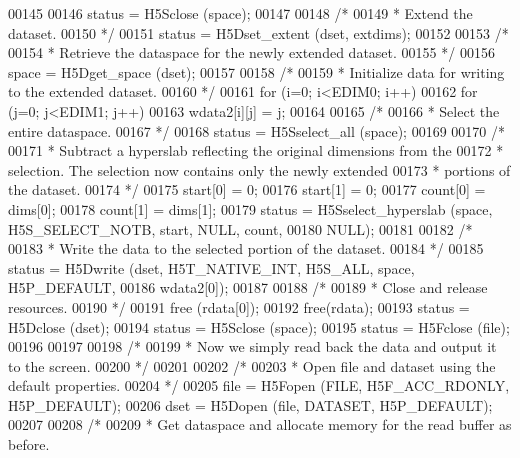 \begin{DoxyCode}
{00145 
00146     status = H5Sclose (space);
00147 
00148     \textcolor{comment}{/*}
00149 \textcolor{comment}{     * Extend the dataset.}
00150 \textcolor{comment}{     */}
00151     status = H5Dset\_extent (dset, extdims);
00152 
00153     \textcolor{comment}{/*}
00154 \textcolor{comment}{     * Retrieve the dataspace for the newly extended dataset.}
00155 \textcolor{comment}{     */}
00156     space = H5Dget\_space (dset);
00157 
00158     \textcolor{comment}{/*}
00159 \textcolor{comment}{     * Initialize data for writing to the extended dataset.}
00160 \textcolor{comment}{     */}
00161     \textcolor{keywordflow}{for} (i=0; i<EDIM0; i++)
00162         \textcolor{keywordflow}{for} (j=0; j<EDIM1; j++)
00163             wdata2[i][j] = j;
00164 
00165     \textcolor{comment}{/*}
00166 \textcolor{comment}{     * Select the entire dataspace.}
00167 \textcolor{comment}{     */}
00168     status = H5Sselect\_all (space);
00169 
00170     \textcolor{comment}{/*}
00171 \textcolor{comment}{     * Subtract a hyperslab reflecting the original dimensions from the}
00172 \textcolor{comment}{     * selection.  The selection now contains only the newly extended}
00173 \textcolor{comment}{     * portions of the dataset.}
00174 \textcolor{comment}{     */}
00175     start[0] = 0;
00176     start[1] = 0;
00177     count[0] = dims[0];
00178     count[1] = dims[1];
00179     status = H5Sselect\_hyperslab (space, H5S\_SELECT\_NOTB, start, NULL, count,
00180                 NULL);
00181 
00182     \textcolor{comment}{/*}
00183 \textcolor{comment}{     * Write the data to the selected portion of the dataset.}
00184 \textcolor{comment}{     */}
00185     status = H5Dwrite (dset, H5T\_NATIVE\_INT, H5S\_ALL, space, H5P\_DEFAULT,
00186                 wdata2[0]);
00187 
00188     \textcolor{comment}{/*}
00189 \textcolor{comment}{     * Close and release resources.}
00190 \textcolor{comment}{     */}
00191     free (rdata[0]);
00192     free(rdata);
00193     status = H5Dclose (dset);
00194     status = H5Sclose (space);
00195     status = H5Fclose (file);
00196 
00197 
00198     \textcolor{comment}{/*}
00199 \textcolor{comment}{     * Now we simply read back the data and output it to the screen.}
00200 \textcolor{comment}{     */}
00201 
00202     \textcolor{comment}{/*}
00203 \textcolor{comment}{     * Open file and dataset using the default properties.}
00204 \textcolor{comment}{     */}
00205     file = H5Fopen (FILE, H5F\_ACC\_RDONLY, H5P\_DEFAULT);
00206     dset = H5Dopen (file, DATASET, H5P\_DEFAULT);
00207 
00208     \textcolor{comment}{/*}
00209 \textcolor{comment}{     * Get dataspace and allocate memory for the read buffer as before.}
}
\end{DoxyCode}
